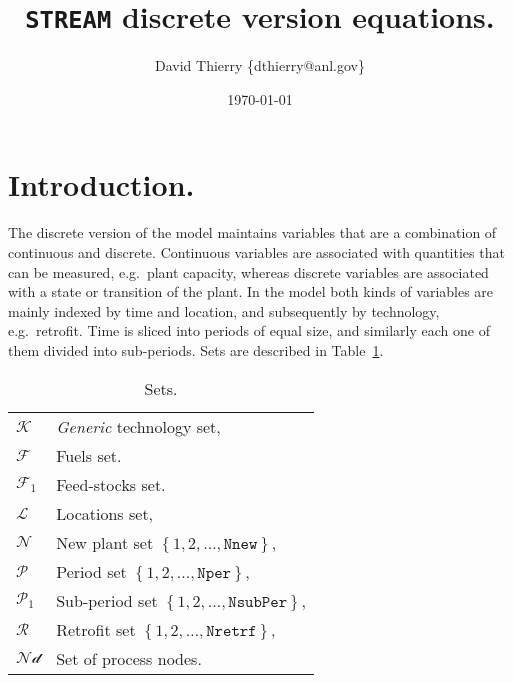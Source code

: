 \documentclass{amsart}
\begin{document}
\title{\texttt{STREAM} discrete version equations.}
\author{David Thierry \{dthierry@anl.gov\}}

\date{\today}
\maketitle

\section{Introduction.}
%
The discrete version of the model maintains variables that are a combination of
continuous and discrete. Continuous variables are associated with quantities
that can be measured, e.g.\ plant capacity, whereas discrete variables are
associated with a state or transition of the plant. 
%
In the model both kinds of variables are mainly indexed by time and
location, and subsequently by technology, e.g.\ retrofit. 
%
Time is sliced into periods of equal size, and similarly each one of them
divided into sub-periods. Sets are described in Table~\ref{tab:sets}.
%
\begin{table}[h]
    \caption{Sets.}
    \begin{tabular}{@{}ll@{}}
        $\mathcal{K}$ & \textit{Generic} technology set,\\
        $\mathcal{F}$ & Fuels set.\\
        $\mathcal{F}_1$	& Feed-stocks set.\\
        $\mathcal{L}$ & Locations set,\\
        $\mathcal{N}$ & New plant set $\left\{1,2,\dots,\mathtt{Nnew}\right\}$,\\
        $\mathcal{P}$	& Period set $\left\{1,2,\dots,\mathtt{Nper}\right\}$, \\
        $\mathcal{P}_1$	& Sub-period set $\left\{1,2,\dots,\mathtt{NsubPer}\right\}$,\\
        $\mathcal{R}$ & Retrofit set $\left\{1,2,\dots,\mathtt{Nretrf}\right\}$,\\
        $\mathcal{Nd}$ & Set of process nodes. \\
    \end{tabular}\label{tab:sets}
\end{table}
%
\end{document}
